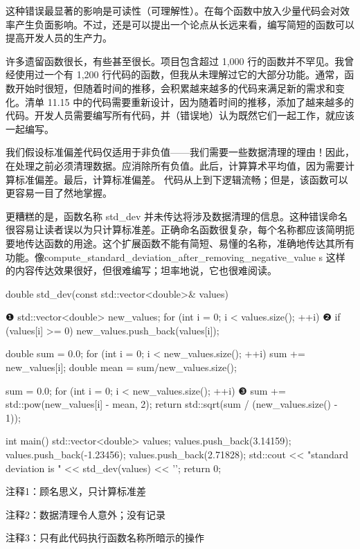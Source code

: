 这种错误最显著的影响是可读性（可理解性）。在每个函数中放入少量代码会对效率产生负面影响。不过，还是可以提出一个论点从长远来看，编写简短的函数可以提高开发人员的生产力。


许多遗留函数很长，有些甚至很长。项目包含超过 1,000 行的函数并不罕见。我曾经使用过一个有 1,200 行代码的函数，但我从未理解过它的大部分功能。通常，函数开始时很短，但随着时间的推移，会积累越来越多的代码来满足新的需求和变化。清单 11.15 中的代码需要重新设计，因为随着时间的推移，添加了越来越多的代码。开发人员需要编写所有代码，并（错误地）认为既然它们一起工作，就应该一起编写。

我们假设标准偏差代码仅适用于非负值——我们需要一些数据清理的理由！因此，在处理之前必须清理数据。应消除所有负值。此后，计算算术平均值，因为需要计算标准偏差。最后，计算标准偏差。
代码从上到下逻辑流畅；但是，该函数可以更容易一目了然地掌握。

更糟糕的是，函数名称 std\_dev 并未传达将涉及数据清理的信息。这种错误命名很容易让读者误以为只计算标准差。正确命名函数很复杂，每个名称都应该简明扼要地传达函数的用途。这个扩展函数不能有简短、易懂的名称，准确地传达其所有功能。像compute\_standard\_deviation\_after\_removing\_negative\_value s 这样的内容传达效果很好，但很难编写；坦率地说，它也很难阅读。


\begin{cpp}
double std_dev(const std::vector<double>& values) { ❶
  std::vector<double> new_values;
  for (int i = 0; i < values.size(); ++i) ❷
    if (values[i] >= 0)
      new_values.push_back(values[i]);

      double sum = 0.0;
  for (int i = 0; i < new_values.size(); ++i)
    sum += new_values[i];
  double mean = sum/new_values.size();

  sum = 0.0;
  for (int i = 0; i < new_values.size(); ++i) ❸
    sum += std::pow(new_values[i] - mean, 2);
  return std::sqrt(sum / (new_values.size() - 1));
}
int main() {
  std::vector<double> values;
  values.push_back(3.14159);
  values.push_back(-1.23456);
  values.push_back(2.71828);
  std::cout << "standard deviation is " << std_dev(values) << '\n';
  return 0;
}
\end{cpp}

{\footnotesize
注释1：顾名思义，只计算标准差

注释2：数据清理令人意外；没有记录

注释3：只有此代码执行函数名称所暗示的操作
}


